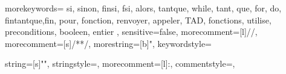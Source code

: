 {
morekeywords={
si, sinon, finsi, fsi, alors,
tantque, while, tant, que,
for, do, fintantque,fin, pour,
fonction, renvoyer, appeler,
TAD, fonctions, utilise, preconditions, 
booleen, entier
},
sensitive=false, %
morecomment=[l]{//}, %
morecomment=[s]{/*}{*/}, %
morestring=[b]", %
keywordstyle=\bfseries\color{darkgray}
}

{
	string=[s]{"}{"},
    stringstyle=\color{underbelux},
	morecomment=[l]{:},
	commentstyle=\color{black},
}


\newcommand{\displaycode}[2][]{\begin{center}\lstinline[mathescape,#1]^#2^ \end{center}}
	



\def\cad{c'est-à-dire}
\def\ie{\emph{i.e.}}
	










